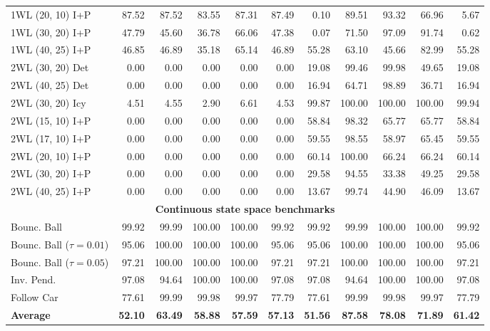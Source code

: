{\begin{tabular}{|l|rrrrr|rrrrr|}
1WL (20, 10) I+P & 87.52 & 87.52 & 83.55 & 87.31 & 87.49 & 0.10 & 89.51 & 93.32 & 66.96 & 5.67 \\
1WL (30, 20) I+P & 47.79 & 45.60 & 36.78 & 66.06 & 47.38 & 0.07 & 71.50 & 97.09 & 91.74 & 0.62 \\
1WL (40, 25) I+P & 46.85 & 46.89 & 35.18 & 65.14 & 46.89 & 55.28 & 63.10 & 45.66 & 82.99 & 55.28 \\
\hline
2WL (30, 20) Det & 0.00 & 0.00 & 0.00 & 0.00 & 0.00 & 19.08 & 99.46 & 99.98 & 49.65 & 19.08 \\
2WL (40, 25) Det & 0.00 & 0.00 & 0.00 & 0.00 & 0.00 & 16.94 & 64.71 & 98.89 & 36.71 & 16.94 \\
\hline
2WL (30, 20) Icy & 4.51 & 4.55 & 2.90 & 6.61 & 4.53 & 99.87 & 100.00 & 100.00 & 100.00 & 99.94 \\
\hline
2WL (15, 10) I+P & 0.00 & 0.00 & 0.00 & 0.00 & 0.00 & 58.84 & 98.32 & 65.77 & 65.77 & 58.84 \\
2WL (17, 10) I+P & 0.00 & 0.00 & 0.00 & 0.00 & 0.00 & 59.55 & 98.55 & 58.97 & 65.45 & 59.55 \\
2WL (20, 10) I+P & 0.00 & 0.00 & 0.00 & 0.00 & 0.00 & 60.14 & 100.00 & 66.24 & 66.24 & 60.14 \\
2WL (30, 20) I+P & 0.00 & 0.00 & 0.00 & 0.00 & 0.00 & 29.58 & 94.55 & 33.38 & 49.25 & 29.58 \\
2WL (40, 25) I+P & 0.00 & 0.00 & 0.00 & 0.00 & 0.00 & 13.67 & 99.74 & 44.90 & 46.09 & 13.67 \\
\hline
\multicolumn{11}{|c|}{\textbf{Continuous state space benchmarks}}\\\hline
Bounc. Ball & 99.92 & 99.99 & 100.00 & 100.00 & 99.92 & 99.92 & 99.99 & 100.00 & 100.00 & 99.92 \\
Bounc. Ball ($\tau=0.01$)& 95.06 & 100.00 & 100.00 & 100.00 & 95.06 & 95.06 & 100.00 & 100.00 & 100.00 & 95.06 \\
Bounc. Ball ($\tau=0.05$) & 97.21 & 100.00 & 100.00 & 100.00 & 97.21 & 97.21 & 100.00 & 100.00 & 100.00 & 97.21 \\
\hline
Inv. Pend. & 97.08 & 94.64 & 100.00 & 100.00 & 97.08 & 97.08 & 94.64 & 100.00 & 100.00 & 97.08 \\
\hline
Follow Car & 77.61 & 99.99 & 99.98 & 99.97 & 77.79 & 77.61 & 99.99 & 99.98 & 99.97 & 77.79 \\
\hline
\textbf{Average} & \textbf{52.10} & \textbf{63.49} & \textbf{58.88} & \textbf{57.59} & \textbf{57.13} & \textbf{51.56} & \textbf{87.58} & \textbf{78.08} & \textbf{71.89} & \textbf{61.42} \\
\hline
\end{tabular}}
